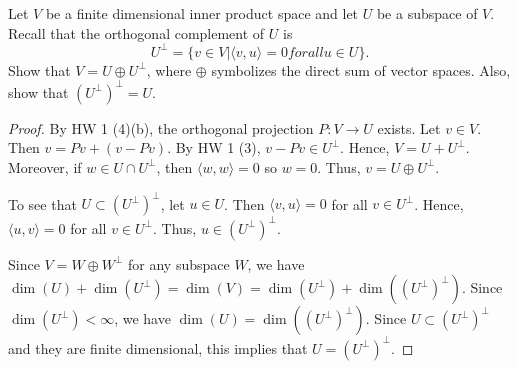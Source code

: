 \documentclass{article}
\begin{document}
 Let $V$ be a finite dimensional inner product space and let $U$ be a subspace of $V$. Recall that the orthogonal complement of $U$ is 
$$U^\perp = \{v \in V | \langle v,u \rangle = 0 for all u \in U\}.$$
Show that $V = U \oplus U^\perp$, where $\oplus$ symbolizes the direct sum of vector spaces. Also, show that $(U^\perp)^\perp = U$.
\begin{proof}
By HW 1 (4)(b), the orthogonal projection $P : V \to U$ exists.  Let $v \in V$. Then $v = Pv + (v - Pv)$. By HW 1 (3), $v - Pv \in U^\perp$. Hence, $V = U + U^\perp$.  Moreover, if $w \in U \cap U^\perp$, then $\langle w, w \rangle = 0$ so $w = 0$. Thus, $v = U \oplus U^\perp$.

To see that $U \subset (U^\perp)^\perp$, let  $u \in U$. Then $\langle v,u \rangle = 0$ for all $v \in U^\perp$. Hence, $\langle u,v \rangle = 0$ for all $v \in U^\perp$. Thus, $u \in (U^\perp)^\perp$.

Since $V = W \oplus W^\perp$ for any subspace $W$, we have $\dim (U) + \dim(U^\perp) = \dim (V) = \dim (U^\perp) + \dim((U^\perp)^\perp)$. Since $\dim(U^\perp) < \infty$, we have $\dim(U) = \dim((U^\perp)^\perp)$.  Since $U \subset (U^\perp)^\perp$ and they are finite dimensional, this implies that $U = (U^\perp)^\perp$.

\end{proof}
\end{document}
